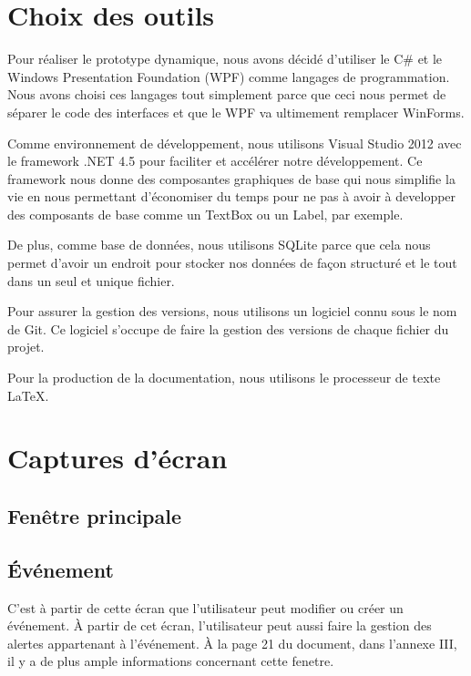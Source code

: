 \documentclass[letterpaper, oneside, 12pt, these, creativecommons]{thETS}
\begin{document}
\section{Choix des outils}

Pour réaliser le prototype dynamique, nous avons décidé d'utiliser le C\# et le Windows Presentation Foundation (WPF) comme langages de programmation. Nous avons choisi ces langages tout simplement parce que ceci nous permet de séparer le code des interfaces et que le WPF va ultimement remplacer WinForms. 

Comme environnement de développement, nous utilisons Visual Studio 2012 avec le framework .NET 4.5 pour faciliter et accélérer notre développement. Ce framework nous donne des composantes graphiques de base qui nous simplifie la vie en nous permettant d'économiser du temps pour ne pas à avoir à developper des composants de base comme un TextBox ou un Label, par exemple.

De plus, comme base de données, nous utilisons SQLite parce que cela nous permet d'avoir un endroit pour stocker nos données de façon structuré et le tout dans un seul et unique fichier.

Pour assurer la gestion des versions, nous utilisons un logiciel connu sous le nom de Git. Ce logiciel s'occupe de faire la gestion des versions de chaque fichier du projet.

Pour la production de la documentation, nous utilisons le processeur de texte \LaTeX.

\newpage

\section{Captures d'écran}

\subsection{Fenêtre principale}

\newpage

\subsection{Événement}

C'est à partir de cette écran que l'utilisateur peut modifier ou créer un événement. À partir de cet écran, l'utilisateur peut aussi faire la gestion des alertes appartenant à l'événement. À la page 21 du document, dans l'annexe III, il y a de plus ample informations concernant cette fenetre.
\end{document}
